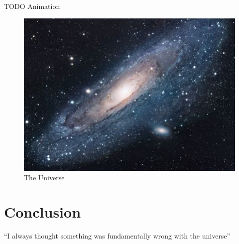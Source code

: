 \documentclass{article}
\begin{document}
TODO Animation

\begin{figure}[h!]
\centering
\includegraphics[scale=1.7]{universe}
\caption{The Universe}
\label{fig:universe}
\end{figure}

\section{Conclusion}
``I always thought something was fundamentally wrong with the universe'' \citep{adams1995hitchhiker}



\end{document}
